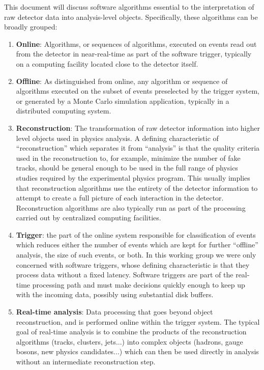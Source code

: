This document will discuss software algorithms essential to the interpretation of raw detector data into analysis-level objects. Specifically, these algorithms can be broadly grouped: 
\begin{enumerate}[itemsep=0ex]
\item
{\bf Online}: Algorithms, or sequences of algorithms, executed on events read out from the detector in near-real-time as part of the software trigger, typically on a computing facility located close to the detector itself.
\item
{\bf Offline}: As distinguished from online, any algorithm or sequence of algorithms executed on the subset of events preselected by the trigger system, or generated by a Monte Carlo simulation application, typically in a distributed computing system.
\item
{\bf Reconstruction}: The transformation of raw detector information into higher level objects used in physics analysis. A defining characteristic of “reconstruction” which separates it from “analysis” is that the quality criteria used in the reconstruction to, for example, minimize the number of fake tracks, should be general enough to be used in the full range of physics studies required by the experimental physics program. This usually implies that reconstruction algorithms use the entirety of the detector information to attempt to create a full picture of each interaction in the detector. Reconstruction algorithms are also typically run as part of the processing carried out by centralized computing facilities.
\item
{\bf Trigger}: the part of the online system responsible for classification of events which reduces either the number of events which are kept for further “offline” analysis, the size of such events, or both. In this working group we were only concerned with software triggers, whose defining characteristic is that they process data without a fixed latency. Software triggers are part of the real-time processing path and must make decisions quickly enough to keep up with the incoming data, possibly using substantial disk buffers.
\item
{\bf Real-time analysis}: Data processing that goes beyond object reconstruction, and is performed online within the trigger system. The typical goal of real-time analysis is to combine the products of the reconstruction algorithms (tracks, clusters, jets...) into complex objects (hadrons, gauge bosons, new physics candidates...) which can then be used directly in analysis without an intermediate reconstruction step. 
\end{enumerate}

